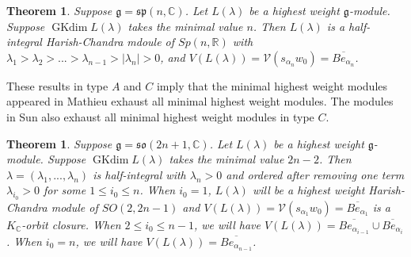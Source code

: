 \documentclass{amsart}[12pt]
\newtheorem{Thm}[Lem]{Theorem}
\newcommand{\gkd}{\operatorname{GKdim}}
\numberwithin{equation}{section}
\begin{document}

\begin{Thm}\label{m21}
		Suppose $\mathfrak{g}=\mathfrak{sp }(n, \mathbb{C})$. Let $L(\lambda)$ be a highest weight $\mathfrak{g}$-module. Suppose $\gkd L(\lambda)$ takes the minimal value $n$. Then
	$L(\lambda)$ is a half-integral Harish-Chandra mdoule of $Sp(n, \mathbb{R})$ with $\lambda_1>\lambda_2>...>\lambda_{n-1}>|\lambda_n|>0$,  and $V(L(\lambda))=\mathcal{V}(s_{\alpha_{n}}w_0)=\overline{Be_{\alpha_{n}}}$.
	
\end{Thm}

These results in type $A$ and $C$ imply that the minimal highest weight modules appeared in Mathieu \cite{Ma} exhaust all minimal highest weight modules. The modules in Sun \cite{Sun} also exhaust all  minimal highest weight modules in type $C$.


\begin{Thm}\label{m22}
	Suppose $\mathfrak{g}=\mathfrak{so }(2n+1, \mathbb{C})$. Let $L(\lambda)$ be a highest weight $\mathfrak{g}$-module. Suppose $\gkd L(\lambda)$ takes the minimal value $2n-2$. Then
$\lambda=(\lambda_1,...,\lambda_n)$ is half-integral  with $\lambda_n>0$  and ordered after removing one term $\lambda_{i_0}>0$ for some $1\leq i_0\leq n$. When ${i_0}=1$, $L(\lambda)$ will be a highest weight Harish-Chandra module of $SO(2,2n-1)$ and $V(L(\lambda))=\mathcal{V}(s_{\alpha_{1}}w_0)=\overline{Be_{\alpha_{1}}}$ is a $K_{\mathbb{C}}$-orbit closure. 	When $2\leq i_0\leq n-1$, we will have $V(L(\lambda))=\overline{Be_{\alpha_{i-1}}}\cup \overline{Be_{\alpha_{i}}}$.  When $ i_0=n$,  we will have $V(L(\lambda))=\overline{Be_{\alpha_{n-1}}}$.
\end{Thm}
\end{document}
